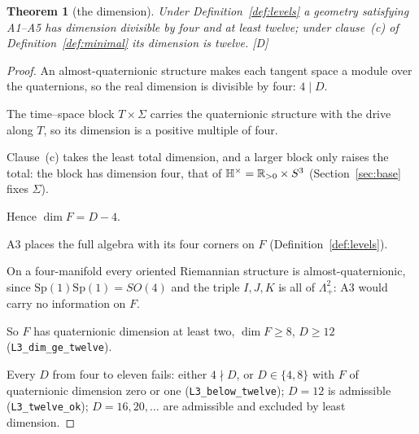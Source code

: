 \documentclass[11pt,a4paper]{article}
\theoremstyle{plain}
\newtheorem{theorem}{Theorem}[section]
\theoremstyle{definition}
\theoremstyle{remark}
\newcommand{\Hquat}{\mathbb{H}}
\newcommand{\rigD}{[\textup{D}]}
\begin{document}
\begin{theorem}[the dimension]\label{thm:dim}
Under Definition~\ref{def:levels} a geometry satisfying A1--A5 has dimension divisible by four and at least twelve; under clause~(c) of Definition~\ref{def:minimal} its dimension is twelve. \rigD
\end{theorem}

\begin{proof}
An almost-quaternionic structure makes each tangent space a module over the quaternions, so the real dimension is divisible by four: $4\mid D$.

The time--space block $T\times\Sigma$ carries the quaternionic structure with the drive along $T$, so its dimension is a positive multiple of four.

Clause~(c) takes the least total dimension, and a larger block only raises the total: the block has dimension four, that of $\Hquat^{\times}=\R_{>0}\times S^{3}$ (Section~\ref{sec:base} fixes $\Sigma$).

Hence $\dim F=D-4$.

A3 places the full algebra with its four corners on $F$ (Definition~\ref{def:levels}).

On a four-manifold every oriented Riemannian structure is almost-quaternionic, since $\mathrm{Sp}(1)\mathrm{Sp}(1)=SO(4)$ and the triple $I,J,K$ is all of $\Lambda^{2}_{+}$: A3 would carry no information on $F$.

So $F$ has quaternionic dimension at least two, $\dim F\geq8$, $D\geq12$ (\texttt{L3\_dim\_ge\_twelve}).

Every $D$ from four to eleven fails: either $4\nmid D$, or $D\in\{4,8\}$ with $F$ of quaternionic dimension zero or one (\texttt{L3\_below\_twelve}); $D=12$ is admissible (\texttt{L3\_twelve\_ok}); $D=16,20,\dots$ are admissible and excluded by least dimension.
\end{proof}
\end{document}

